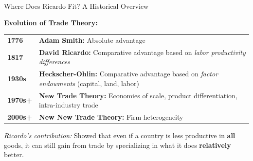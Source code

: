 \documentclass{beamer}
\begin{document}
\begin{frame}{Where Does Ricardo Fit? A Historical Overview}

\textbf{Evolution of Trade Theory:}

\vspace{0.3cm}

\begin{tabular}{lp{7cm}}
\textbf{1776} & \textbf{Adam Smith:} Absolute advantage \\[0.2cm]
\textbf{1817} & \textbf{David Ricardo:} Comparative advantage based on \textit{labor productivity differences} \\[0.2cm]
\textbf{1930s} & \textbf{Heckscher-Ohlin:} Comparative advantage based on \textit{factor endowments} (capital, land, labor) \\[0.2cm]
\textbf{1970s+} & \textbf{New Trade Theory:} Economies of scale, product differentiation, intra-industry trade \\[0.2cm]
\textbf{2000s+} & \textbf{New New Trade Theory:} Firm heterogeneity
\end{tabular}

\vspace{0.5cm}

\textit{Ricardo's contribution:} Showed that even if a country is less productive in \textbf{all} goods, it can still gain from trade by specializing in what it does \textbf{relatively} better.

\end{frame}

\end{document}
